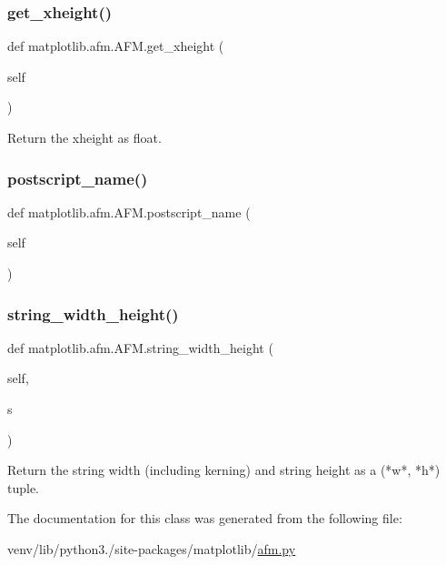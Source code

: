 \subsubsection{\texorpdfstring{get\+\_\+xheight()}{get\_xheight()}}
{\footnotesize\ttfamily def matplotlib.\+afm.\+A\+F\+M.\+get\+\_\+xheight (\begin{DoxyParamCaption}\item[{}]{self }\end{DoxyParamCaption})}

\begin{DoxyVerb}Return the xheight as float.\end{DoxyVerb}
 \mbox{\label{classmatplotlib_1_1afm_1_1AFM_a8bf75973af64978e5cd775c8434d00f5}} 
\subsubsection{\texorpdfstring{postscript\+\_\+name()}{postscript\_name()}}
{\footnotesize\ttfamily def matplotlib.\+afm.\+A\+F\+M.\+postscript\+\_\+name (\begin{DoxyParamCaption}\item[{}]{self }\end{DoxyParamCaption})}

\mbox{\label{classmatplotlib_1_1afm_1_1AFM_a290ed63a3b5bcae829eb655720103d47}} 
\subsubsection{\texorpdfstring{string\+\_\+width\+\_\+height()}{string\_width\_height()}}
{\footnotesize\ttfamily def matplotlib.\+afm.\+A\+F\+M.\+string\+\_\+width\+\_\+height (\begin{DoxyParamCaption}\item[{}]{self,  }\item[{}]{s }\end{DoxyParamCaption})}

\begin{DoxyVerb}Return the string width (including kerning) and string height
as a (*w*, *h*) tuple.
\end{DoxyVerb}
 

The documentation for this class was generated from the following file\+:\begin{DoxyCompactItemize}
\item 
venv/lib/python3./site-\/packages/matplotlib/\hyperlink{afm_8py}{afm.\+py}\end{DoxyCompactItemize}
